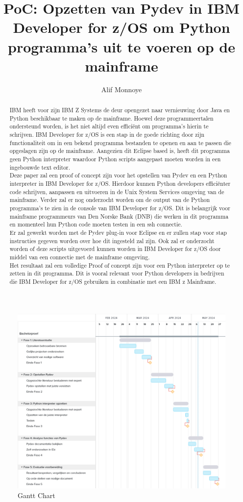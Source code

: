 \documentclass{hogent-article}
\title{PoC: Opzetten van Pydev in IBM Developer for z/OS om Python programma's uit te voeren op de mainframe}
\author{Alif Monnoye}
\begin{document}
\begin{abstract}
    IBM heeft voor zijn IBM Z Systems de deur opengezet naar vernieuwing door Java en Python beschikbaar te maken op de mainframe. Hoewel deze programmeertalen ondersteund worden, is het niet altijd even efficiënt om programma's hierin te schrijven. IBM Developer for z/OS is een stap in de goede richting door zijn functionaliteit om in een bekend programma bestanden te openen en aan te passen die opgeslagen zijn op de mainframe. Aangezien dit Eclipse based is, heeft dit programma geen Python interpreter waardoor Python scripts aangepast moeten worden in een ingebouwde text editor. \\
    
    Deze paper zal een proof of concept zijn voor het opstellen van Pydev en een Python interpreter in IBM Developer for z/OS. Hierdoor kunnen Python developers efficiënter code schrijven, aanpassen en uitvoeren in de Unix System Services omgeving van de mainframe. Verder zal er nog onderzocht worden om de output van de Python programma's te zien in de console van IBM Developer for z/OS. Dit is belangrijk voor mainframe programmeurs van Den Norske Bank (DNB) die werken in dit programma en momenteel hun Python code moeten testen in een ssh connectie. \\
    Er zal gewerkt worden met de Pydev plug-in voor Eclipse en er zullen stap voor stap instructies gegeven worden over hoe dit ingesteld zal zijn. Ook zal er onderzocht worden of deze scripts uitgevoerd kunnen worden in IBM Developer for z/OS door middel van een connectie met de mainframe omgeving. \\
    
    Het resultaat zal een volledige Proof of concept zijn voor een Python interpreter op te zetten in dit programma. Dit is vooral relevant voor Python developers in bedrijven die IBM Developer for z/OS gebruiken in combinatie met een IBM z Mainframe. 
\end{abstract}

\tableofcontents


\newpage
\printbibliography[heading=bibintoc]

\cleardoublepage
\begin{figure}[pt!]
    \centering
    \includegraphics[width=550pt]{GanttChart_Updated.png}
    \caption{Gantt Chart}
    \label{fig}
\end{figure}
\end{document}
